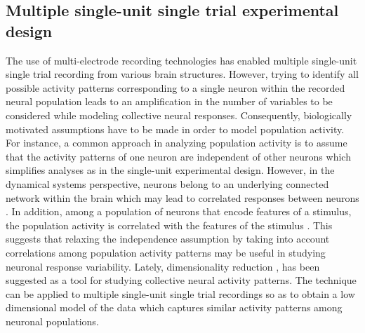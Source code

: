 \subsection{Multiple single-unit single trial experimental design}
The use of multi-electrode \cite{Kipke2008} recording technologies has enabled  multiple single-unit single trial recording from various brain structures. However, trying to identify all possible activity patterns  corresponding to  a single neuron within the recorded neural population leads to an amplification in the number of variables to be considered while modeling collective neural responses. Consequently, biologically motivated assumptions have to be made in order to model population activity. For instance, a common approach in analyzing population activity is to assume that the activity patterns of one neuron are independent of other neurons which simplifies  analyses as in the single-unit experimental design. However, in the dynamical systems perspective, neurons belong to an underlying connected network within the brain  which may lead to correlated responses between neurons \cite{Shenoy2013}. In addition, among a population of neurons that encode features of a stimulus, the population activity is correlated with the features of the stimulus \cite{Georgopoulos1982, Hubel1968}. This suggests that relaxing the independence assumption by
taking into account correlations among population activity patterns may be useful in studying neuronal response
variability. Lately, dimensionality reduction \cite{Cunningham2014a}, has been suggested as a tool for studying collective neural activity patterns. The technique can be applied to multiple single-unit single trial recordings so as to obtain a low dimensional model of the data which captures similar activity patterns among neuronal populations.


